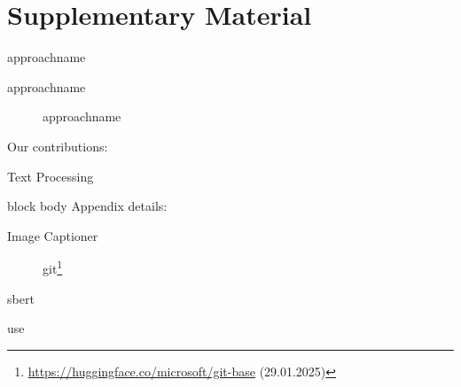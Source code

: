 \appendix
\section{Supplementary Material}

\begin{frame}{\acs{approachname}}
    \begin{description}
    \item[\acs{approachname}] \acl{approachname}
    \end{description}

    Our contributions:
    \begin{itemize}
    \end{itemize}
\end{frame}

\begin{frame}{Text Processing}
    
      \vfill
    \begin{beamercolorbox}[center, wd=\linewidth, sep=1ex, rounded=true, shadow=true]{block body}
        {\small Appendix details: } 
        \hyperlink{supp:img_cap}{}
        \hspace{1em}
        \hyperlink{supp:sbert}{}
    \end{beamercolorbox}
\end{frame}

\begin{frame}{Image Captioner~\parencite{git_2022}}
    \label{supp:img_cap}
    \begin{figure}
        
        \caption{\ac{git}\footnote{\url{https://huggingface.co/microsoft/git-base} (29.01.2025)}}
    \end{figure}
\end{frame}

\begin{frame}{\ac{sbert}~\parencite{sbert_2019}}
    \label{supp:sbert}
    
\end{frame}

\begin{frame}{\ac{use}~\parencite{use_2019}}
    \label{supp:use}
    
\end{frame}